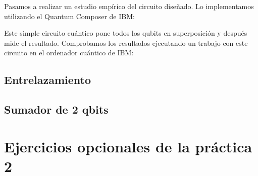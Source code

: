 \documentclass[11pt]{article}
\begin{document}
Pasamos a realizar un estudio empírico del circuito diseñado. Lo implementamos utilizando el Quantum Composer de IBM:


Este simple circuito cuántico pone todos los qubits en superposición y después mide el resultado. Comprobamos los resultados ejecutando un trabajo con este circuito en el ordenador cuántico de IBM:




\subsection{Entrelazamiento}

\subsection{Sumador de 2 qbits}

\section{Ejercicios opcionales de la práctica 2}
\end{document}
